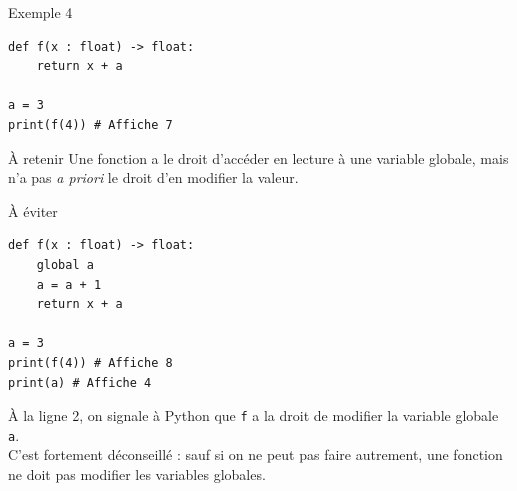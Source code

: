 \documentclass[10pt]{beamer}
\begin{document}
\begin{frame}[fragile]{Exemple 4}
\begin{verbatim}
def f(x : float) -> float:
    return x + a

a = 3
print(f(4)) # Affiche 7

\end{verbatim}
    \pause
{}
\begin{alertblock}{À retenir}
    Une fonction a le droit d'\alert{accéder en lecture} à une variable globale, mais n'a pas \textit{a priori} le droit d'en modifier la valeur.
\end{alertblock}
\end{frame}

\begin{frame}[fragile]{À éviter}
    \begin{verbatim}
def f(x : float) -> float:
    global a
    a = a + 1
    return x + a

a = 3
print(f(4)) # Affiche 8
print(a) # Affiche 4

\end{verbatim}
    \pause
À la ligne 2, on signale à Python que \texttt{f} a la droit de modifier la variable globale \texttt{a}.\\

C'est fortement déconseillé : sauf si on ne peut pas faire autrement, une fonction ne doit pas modifier les variables globales.

\end{frame}
\end{document}
